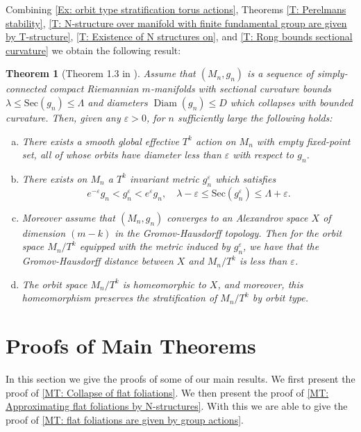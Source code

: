 \documentclass[12pt,a4paper,reqno]{amsart}
\newtheorem{theorem}{Theorem}[section]
\theoremstyle{definition}
\numberwithin{equation}{section}
\newcommand{\Sec}{\mathrm{Sec}}
\DeclareMathOperator{\diam}{Diam}
\begin{document}
Combining \th\ref{Ex: orbit type stratification torus actions}, Theorems \ref{T: Perelmans stability}, \ref{T: N-structure over manifold with finite fundamental group are given by T-structure}, \ref{T: Existence of N structures on}, and \ref{T: Rong bounds sectional curvature} we obtain the following result: 

\begin{theorem}[Theorem 1.3 in \cite{PetruninRongTuschmann1999}]\th\label{T: Bounded collapse in 1-connnected manifolds}
Assume that $(M_n, g_n)$ is a sequence of simply-connected compact Riemannian $m$-manifolds with sectional curvature bounds \linebreak$\lambda \leq \Sec(g_n) \leq\Lambda$ and diameters $\diam(g_n) \leq D$ which collapses with bounded curvature. Then, given any $\varepsilon>0$, for $n$ sufficiently large the following holds:
\begin{enumerate}[(a)]
\item There exists a smooth global effective $T^k$ action on $M_n$ with empty fixed-point set, all of whose orbits have diameter less than $\varepsilon$ with respect to $g_n$.
\item There exists on $M_n$ a $T^k$ invariant metric $g^\varepsilon_n$ which satisfies
\[
e^{-\varepsilon}g_n < g^\varepsilon_n < e^\varepsilon g_n,\quad \lambda- \varepsilon \leq \Sec(g^\varepsilon_n) \leq \Lambda +\varepsilon.
\]
\item Moreover assume that $(M_n,g_n)$ converges to an Alexandrov space $X$ of dimension $(m-k)$ in the Gromov-Hausdorff topology. Then for  the orbit space $M_n/T^k$ equipped with the metric induced by $g^\varepsilon_n$, we have that the Gromov-Hausdorff distance between $X$ and $M_n/T^k$ is less than $\varepsilon$.
\item The orbit space $M_n/T^k$ is homeomorphic to $X$, and moreover, this homeomorphism preserves the stratification of $M_n/T^k$ by orbit type.
\end{enumerate}
\end{theorem}

\section{Proofs of Main Theorems}\label{S: Proofs of main theorems}

In this section we give the proofs of some of our main results. We first present the proof of \th\ref{MT: Collapse of flat foliations}. We then present the proof of \th\ref{MT: Approximating flat foliations by N-structures}. With this we are able to give the proof of \th\ref{MT: flat foliations are given by group actions}. 
\end{document}
